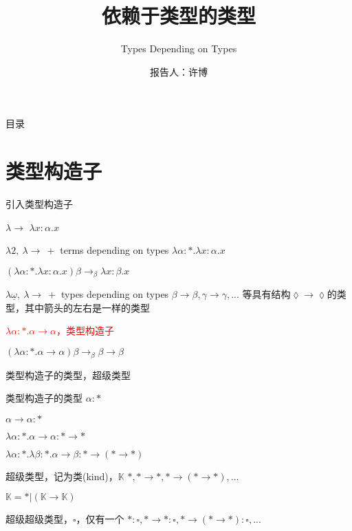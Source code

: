 \documentclass[UTF8,aspectratio=169,mathserif]{beamer}
\title{依赖于类型的类型}
\subtitle{Types Depending on Types}
\author{报告人：许博}
\date{}
\begin{document}
	
	\begin{frame}
		\titlepage
	\end{frame}

	\begin{frame}{目录}
		\tableofcontents
	\end{frame}

	\section{类型构造子}
		\begin{frame}{引入类型构造子}
			\begin{block}{$\lambda{\rightarrow}$}
				$\lambda x:\alpha.x$
			\end{block}
			
			\begin{block}{$\lambda{2},\ \lambda{\rightarrow}\ + $ terms depending on types}
				$\lambda\alpha:*.\lambda x:\alpha.x$
				
				$(\lambda\alpha:*.\lambda x:\alpha.x)\beta\rightarrow_\beta\lambda x:\beta.x$
			\end{block}
		
			\begin{block}{$\lambda{\underline{\omega}},\ \lambda{\rightarrow}\ + $ types depending on types}
				$\beta\rightarrow\beta,\gamma\rightarrow\gamma,...$ 等具有结构$\lozenge\rightarrow\lozenge$的类型，其中箭头的左右是一样的类型
				
				\textcolor{red}{$\lambda\alpha:*.\alpha\rightarrow\alpha$，类型构造子}
				
				$(\lambda\alpha:*.\alpha\rightarrow\alpha)\beta\rightarrow_\beta\beta\rightarrow\beta$
			\end{block}
		\end{frame}
	
		\begin{frame}[shrink]{类型构造子的类型，超级类型}
			\begin{block}{类型构造子的类型}
				$\alpha:*$
				
				$\alpha\rightarrow\alpha:*$
				
				$\lambda\alpha:*.\alpha\rightarrow\alpha:*\rightarrow*$
				
				$\lambda\alpha:*.\lambda\beta:*.\alpha\rightarrow\beta:*\rightarrow(*\rightarrow*)$
			\end{block}
			\begin{block}{超级类型，记为类(kind)，$\mathbb{K}$}
				$*, *\rightarrow*, *\rightarrow(*\rightarrow*), ...$
				
				$\mathbb{K}=*|(\mathbb{K}\rightarrow\mathbb{K})$
			\end{block}
			\begin{block}{超级超级类型，$\square$，仅有一个}
				$*:\square, *\rightarrow*:\square, *\rightarrow(*\rightarrow*):\square, ...$
			\end{block}
		\end{frame}
	
\end{document}
